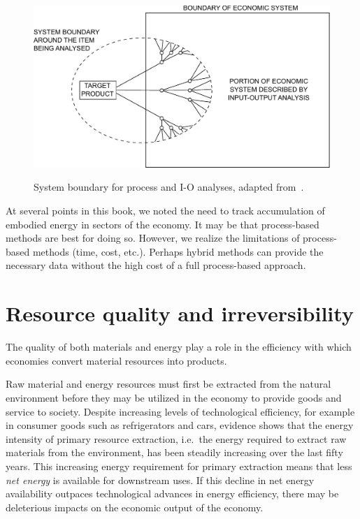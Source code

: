 \begin{figure}[p]
\centering\
\includegraphics[width=\linewidth]{Part_3/Chapter_Unfinished/images/Hybrid_boundary.pdf}
\caption[System boundary for process and I-O analyses]{System boundary for process and I-O analyses, adapted from~\cite{Bullard:1978vd}.}
\label{fig:Hybrid_boundary}
\end{figure}

At several points in this book,
we noted the need to track accumulation of embodied
energy in sectors of the economy.
It may be that process-based methods are best for doing so.
However, we realize the limitations of process-based
methods (time, cost, etc.).
Perhaps hybrid methods can provide the necessary 
data without the high 
cost of a full process-based approach.


\section{Resource quality and irreversibility}
\label{sec:resource_quality_and_irreversibility}

The quality of both materials 
and energy play a role in the 
efficiency with which economies 
convert material resources into products.

Raw material and energy resources must first 
be extracted from the natural environment 
before they may be utilized in the economy 
to provide goods and service to society. 
Despite increasing levels of technological efficiency, 
for example in consumer goods such as refrigerators and cars, 
evidence shows that 
the energy intensity of primary resource extraction, 
i.e.\ the energy required to extract raw materials 
from the environment, 
has been steadily increasing over 
the last fifty years.\cite{Hall1986, Mudd2010, Brandt2011} 
This increasing energy requirement for 
primary extraction means that 
less \textit{net energy} is available 
for downstream uses. 
If this decline in net energy availability 
outpaces technological advances in energy efficiency, 
there may be deleterious impacts on the 
economic output of the economy.

